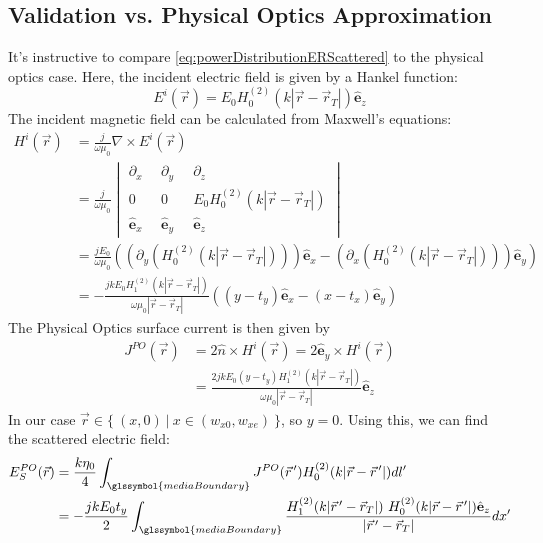 \documentclass{article}
\begin{document}
\subsection{Validation vs. Physical Optics Approximation}
It's instructive to compare \eqref{eq:powerDistributionERScattered} to the physical
optics case. Here, the incident electric field is given by a Hankel function:
\begin{equation}
   E^i(\vec{r}) = E_0 H_0^{(2)}(k|\vec{r} - \vec{r}_T|) \hat{\mathbf{e}}_z
   \label{eq:incidentPOSetup1}
\end{equation}
The incident magnetic field can be calculated from Maxwell's equations:
\begin{align}
   H^i( \vec{r} ) &= \frac{j}{\omega \mu_0} \nabla \times E^i(\vec{r}) \nonumber \\
   &= \frac{j}{\omega \mu_0} 
      \begin{vmatrix} 
         \partial_x & \partial_y & \partial_z \\
         0 \quad & 0 \quad & E_0 H_0^{(2)}(k|\vec{r} - \vec{r}_T|) \\
         \hat{\mathbf{e}}_x & \hat{\mathbf{e}}_y & \hat{\mathbf{e}}_z
      \end{vmatrix}
      \nonumber \\
   &= \frac{j E_0}{\omega \mu_0 } \left( \left( \partial_y ( H_0^{(2)}(k|\vec{r} -
      \vec{r}_T|)) \right) \hat{\mathbf{e}}_x - \left( \partial_x (
      H_0^{(2)}(k|\vec{r} - \vec{r}_T|)) \right) \hat{\mathbf{e}}_y \right) \nonumber
      \\
   &= - \frac{jk E_0 H_1^{(2)} (k|\vec{r} - \vec{r}_T|) }{\omega \mu_0 |\vec{r} -
      \vec{r}_T|} \left( ( y - t_y ) \hat{\mathbf{e}}_x - ( x - t_x ) \hat{\mathbf{e}}_y\right)
\end{align}
The Physical Optics surface current is then given by 
\begin{align}
   J^{PO}(\vec{r}) &= 2 \hat{n} \times H^i( \vec{r} ) = 2 \hat{\mathbf{e}}_y \times
      H^i( \vec{r} ) \nonumber \\
   &= \frac{2jk E_0 (y-t_y) H_1^{(2)} (k|\vec{r} - \vec{r}_T|) }{\omega \mu_0
      |\vec{r} - \vec{r}_T|} \hat{\mathbf{e}}_z
\end{align}
In our case $\vec{r} \in \{ \ (x , 0) \ | \ x \in (w_{x0}, w_{xe}) \ \}$, so $y = 0$.
Using this, we can find the scattered electric field:
\begin{align}
   E_S^{PO}(\vec{r}) &= \frac{k \eta_0}{4} \int_{\glssymbol{mediaBoundary}} J^{PO}(\vec{r}^{\,\prime})
      H_0^{(2)}(k |\vec{r} - \vec{r}^{\,\prime}|) dl' \nonumber \\
   &= - \frac{j k E_0 t_y }{2} \int_{\glssymbol{mediaBoundary}}
      \frac{H_1^{(2)}(k | \vec{r}^{\,\prime} - \vec{r}_T |) \ H_0^{(2)}(k |\vec{r} -
      \vec{r}^{\,\prime}|)\hat{\mathbf{e}}_z }{|\vec{r}^{\,\prime} - \vec{r}_T|} dx'
   \end{align}
\end{document}
